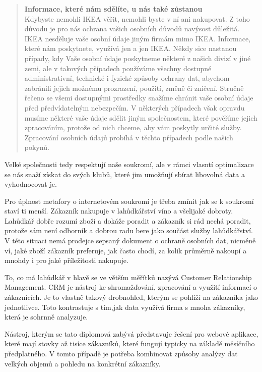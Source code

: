 \documentclass[bc,male,java,dept456]{diploma}						%
\begin{document}
\begin{quote}
{\bf Informace, které nám sdělíte, u nás také zůstanou}\\
Kdybyste nemohli IKEA věřit, nemohli byste v ní ani nakupovat. Z toho dů\-vo\-du je pro nás ochrana vašich osobních důvodů navýsost důležitá. IKEA nesděluje vaše osobní údaje jiným firmám mimo IKEA. Informace, které nám poskytnete, využívá jen a jen IKEA. Někdy sice nastanou případy, kdy Vaše osobní údaje poskytneme některé z našich divizí v jiné zemi, ale v takových případech používáme všechny dostupné administrativní, technické i fyzické způsoby ochrany dat, abychom zabránili jejich možnému prozrazení, použití, změně či zničení. Stručně řečeno se všemi dostupnými prostředky snažíme chránit vaše osobní údaje před předvídatelným nebezpečím. V některých pří\-pa\-dech však opravdu musíme některé vaše údaje sdělit jiným společnostem, které pověříme jejich zpracováním, protože od nich chceme, aby vám poskytly určité služby. Zpracování osobních údajů probíhá v těchto případech podle našich pokynů. 
\end{quote}

Velké společnosti tedy respektují naše soukromí, ale v rámci vlasntí optimalizace se nás snaží získat do svých klubů, které jim umožňují sbírat libovolná data a vyhodnocovat je.

Pro úplnost metafory o internetovém soukromí je třeba zmínit jak se k soukromí staví ti menší. Zákazník nakupuje v lahůdkářství víno a všelijaké dobroty. Lahůdkář dobře rozumí zboží a dokáže poradit a zákazník si rád nechá poradit,  protože sám není odborník a dobrou radu bere jako součást služby lahůdkářství. V této situaci nemá prodejce sepsaný dokument o ochraně osobních dat, nicméně ví, jaké zboží zákazník preferuje, jak často chodí, za kolik průměrně nakoupí a mnohdy i pro jaké příležitosti nakupuje.

To, co má lahůdkář v hlavě se ve větším měřítků nazývá Customer Relationship Management. CRM je nástroj ke shromažďování, zpracování a využití informací o zákaznících. Je to vlastně takový drobnohled, kterým se pohlíží na zákazníka jako jednotlivce. Toto kontrastuje s tím,jak data využívá firma s mnoha zákazníky, která je sohrnně analyzuje.

\bigskip

Nástroj, kterým se tato diplomová zabývá představuje řešení pro webové aplikace, které mají stovky až tisíce zákazníků, které fungují typicky na základě měsíčního před\-plat\-ného. V tomto případě je potřeba kombinovat způsoby analýzy dat velkých objemů a pohledu na konkrétní zákazníky. 
\end{document}
